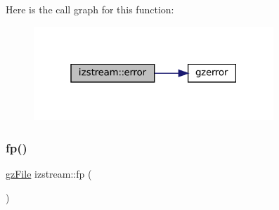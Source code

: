 Here is the call graph for this function\+:
\nopagebreak
\begin{figure}[H]
\begin{center}
\leavevmode
\includegraphics[width=256pt]{classizstream_a19ca9a17f897366d081aae3950f7946e_cgraph}
\end{center}
\end{figure}
\mbox{\label{classizstream_a0438da66cc9cdb1a2a7ab4872a909fbf}} 
\subsubsection{\texorpdfstring{fp()}{fp()}}
{\footnotesize\ttfamily \mbox{\hyperlink{zlib_8h_a8e80bd9e2c359bc5bdabb2e97b4e62bf}{gz\+File}} izstream\+::fp (\begin{DoxyParamCaption}{ }\end{DoxyParamCaption})\hspace{0.3cm}{\ttfamily [inline]}}

